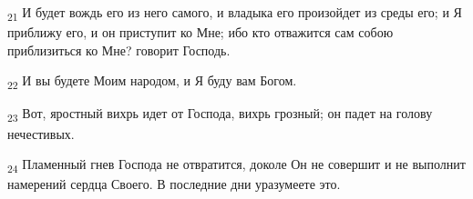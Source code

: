 \begin{tcolorbox}
\textsubscript{21} И будет вождь его из него самого, и владыка его произойдет из среды его; и Я приближу его, и он приступит ко Мне; ибо кто отважится сам собою приблизиться ко Мне? говорит Господь.
\end{tcolorbox}
\begin{tcolorbox}
\textsubscript{22} И вы будете Моим народом, и Я буду вам Богом.
\end{tcolorbox}
\begin{tcolorbox}
\textsubscript{23} Вот, яростный вихрь идет от Господа, вихрь грозный; он падет на голову нечестивых.
\end{tcolorbox}
\begin{tcolorbox}
\textsubscript{24} Пламенный гнев Господа не отвратится, доколе Он не совершит и не выполнит намерений сердца Своего. В последние дни уразумеете это.
\end{tcolorbox}
